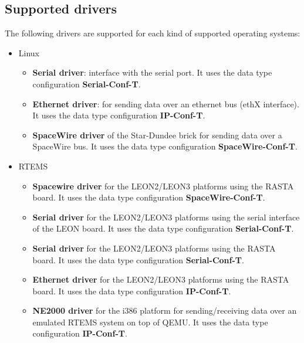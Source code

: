 \documentclass[11pt]{book}
\begin{document}
   \subsection{Supported drivers}
   \label{polyorbhic-drivers}
   The following drivers are supported for each kind of supported operating
   systems:
   \begin{itemize}
      \item
         Linux
         \begin{itemize}
            \item
               \textbf{Serial driver}: interface with the serial port. 
               It uses the data type configuration \textbf{Serial-Conf-T}.
            \item
               \textbf{Ethernet driver}: for sending data over an ethernet bus (ethX
               interface).
               It uses the data type configuration \textbf{IP-Conf-T}.
            \item
               \textbf{SpaceWire driver} of the Star-Dundee brick for sending data 
               over a SpaceWire bus.
               It uses the data type configuration \textbf{SpaceWire-Conf-T}.
         \end{itemize}
      \item
         RTEMS
         \begin{itemize}
            \item
               \textbf{Spacewire driver} for the LEON2/LEON3 platforms using the RASTA
               board.
               It uses the data type configuration \textbf{SpaceWire-Conf-T}.
            \item
               \textbf{Serial driver} for the LEON2/LEON3 platforms using the serial
               interface of the LEON board.
               It uses the data type configuration \textbf{Serial-Conf-T}.
            \item
               \textbf{Serial driver} for the LEON2/LEON3 platforms using the RASTA
               board.
               It uses the data type configuration \textbf{Serial-Conf-T}.
            \item
               \textbf{Ethernet driver} for the LEON2/LEON3 platforms using the RASTA
               board.
               It uses the data type configuration \textbf{IP-Conf-T}.
            \item
              \textbf{NE2000 driver} for the i386 platform for sending/receiving data
              over an emulated RTEMS system on top of QEMU. 
               It uses the data type configuration \textbf{IP-Conf-T}.
         \end{itemize}
   \end{itemize}
\end{document}
